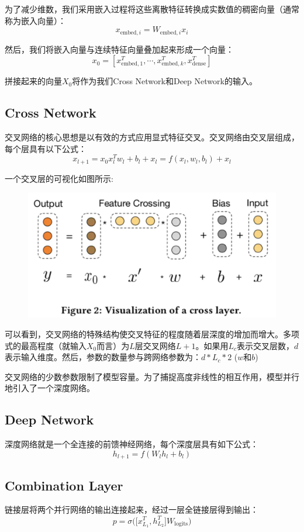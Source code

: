 \documentclass[12pt]{article}
\begin{document}
为了减少维数，我们采用嵌入过程将这些离散特征转换成实数值的稠密向量（通常称为嵌入向量）：
$$
x_{\text{embed},i} = W_{\text{embed},i}x_i
$$

然后，我们将嵌入向量与连续特征向量叠加起来形成一个向量：
$$
x_0 = [x_{\text{embed},1}^T, \cdots, x_{\text{embed},k}^T, x_{\text{dense}}^T]
$$

拼接起来的向量$X_0$将作为我们Cross Network和Deep Network的输入。

\subsection{Cross Network}
交叉网络的核心思想是以有效的方式应用显式特征交叉。交叉网络由交叉层组成，每个层具有以下公式：
$$
x_{l+1} = x_0x_l^Tw_l + b_l + x_l = f(x_l, w_l, b_l) + x_l
$$

一个交叉层的可视化如图所示:
\begin{figure}[H]
    \centering
    \includegraphics[width=.8\textwidth]{fig/DCN_Cross_Detail.png}
\end{figure}

可以看到，交叉网络的特殊结构使交叉特征的程度随着层深度的增加而增大。多项式的最高程度（就输入$X_0$而言）为$L$层交叉网络$L + 1$。如果用$L_c$表示交叉层数，$d$表示输入维度。然后，参数的数量参与跨网络参数为：$d * L_c * 2$ ($w$和$b$)

交叉网络的少数参数限制了模型容量。为了捕捉高度非线性的相互作用，模型并行地引入了一个深度网络。

\subsection{Deep Network}
深度网络就是一个全连接的前馈神经网络，每个深度层具有如下公式：
$$
h_{l+1} = f(W_lh_l + b_l)
$$

\subsection{Combination Layer}
链接层将两个并行网络的输出连接起来，经过一层全链接层得到输出：
$$
p = \sigma\Big( \Big[ x_{L_1}^T, h_{L_2}^T\Big] W_{\text{logits}}\Big)
$$
\end{document}

